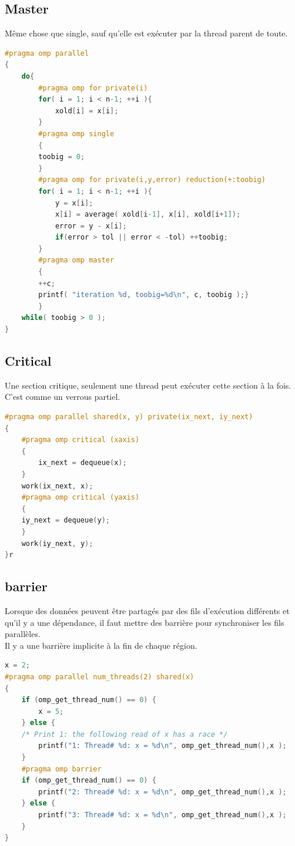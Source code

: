 \documentclass[oneside]{book}
\begin{document}
\subsection{Master}
Même chose que single, sauf qu'elle est exécuter par la thread parent de toute.
\begin{lstlisting}[language=c]
#pragma omp parallel
{ 
	do{
		#pragma omp for private(i)
		for( i = 1; i < n-1; ++i ){ 
			xold[i] = x[i]; 
		}
		#pragma omp single
		{ 
		toobig = 0; 
		}
		#pragma omp for private(i,y,error) reduction(+:toobig)
		for( i = 1; i < n-1; ++i ){ 
			y = x[i];
			x[i] = average( xold[i-1], x[i], xold[i+1]);
			error = y - x[i];
			if(error > tol || error < -tol) ++toobig;
		}
		#pragma omp master
		{ 
		++c; 
		printf( "iteration %d, toobig=%d\n", c, toobig );}
		} 
	while( toobig > 0 );
}
\end{lstlisting}

\subsection{Critical}
Une section critique, seulement une thread peut exécuter cette section à la fois. C'est comme un verrous partiel.
\begin{lstlisting}[language=c]
#pragma omp parallel shared(x, y) private(ix_next, iy_next)
{
	#pragma omp critical (xaxis)
	{ 
		ix_next = dequeue(x); 
	}
	work(ix_next, x);
	#pragma omp critical (yaxis)
	{ 
	iy_next = dequeue(y); 
	}
	work(iy_next, y);
}r
\end{lstlisting}

\subsection{barrier}
Lorsque des données peuvent être partagés par des fils d'exécution différents et qu'il y a une dépendance, il faut mettre des barrière pour synchroniser les fils parallèles.\\

Il y a une barrière implicite à la fin de chaque région.
\begin{lstlisting}[language=c]
x = 2;
#pragma omp parallel num_threads(2) shared(x)
{
	if (omp_get_thread_num() == 0) {
		x = 5;
	} else {
	/* Print 1: the following read of x has a race */
		printf("1: Thread# %d: x = %d\n", omp_get_thread_num(),x );
	}
	#pragma omp barrier
	if (omp_get_thread_num() == 0) {
		printf("2: Thread# %d: x = %d\n", omp_get_thread_num(),x );
	} else {
		printf("3: Thread# %d: x = %d\n", omp_get_thread_num(),x );
	}
}
\end{lstlisting}
\end{document}
